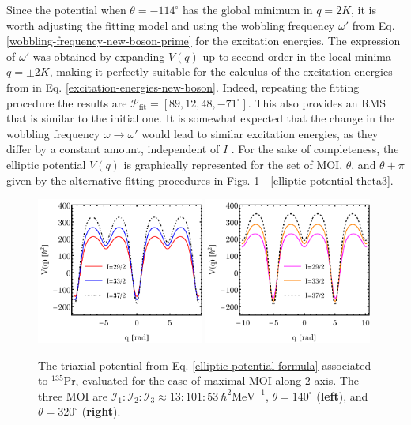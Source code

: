 Since the potential when $\theta=-114^\circ$ has the global minimum in $q=2K$, it is worth adjusting the fitting model and using the wobbling frequency $\omega'$ from Eq. \ref{wobbling-frequency-new-boson-prime} for the excitation energies. The expression of $\omega'$ was obtained by expanding $V(q)$ up to second order in the local minima $q=\pm 2K$, making it perfectly suitable for the calculus of the excitation energies from in Eq. \ref{excitation-energies-new-boson}. Indeed, repeating the fitting procedure the results are $\mathcal{P}_\text{fit}=\left[89,12,48,-71^\circ\right]$. This also provides an RMS that is similar to the initial one. It is somewhat expected that the change in the wobbling frequency $\omega\rightarrow\omega'$ would lead to similar excitation energies, as they differ by a constant amount, independent of $I$ \cite{raduta2020new}. For the sake of completeness, the elliptic potential $V(q)$ is graphically represented for the set of MOI, $\theta$, and $\theta+\pi$ given by the alternative fitting procedures in Figs. \ref{elliptic-potential-theta2} - \ref{elliptic-potential-theta3}.
\begin{figure}
    \centering
    \includegraphics[width=0.49\textwidth]{Chapters/Figures/potential-fit2-theta.pdf}
    \includegraphics[width=0.49\textwidth]{Chapters/Figures/potential-fit2-theta-pi.pdf}
    \caption{The triaxial potential from Eq. \ref{elliptic-potential-formula} associated to $^{135}$Pr, evaluated for the case of maximal MOI along $2$-axis. The three MOI are $\mathcal{I}_1:\mathcal{I}_2:\mathcal{I}_3\approx13:101:53\ \hbar^2\text{MeV}^{-1}$, $\theta=140^\circ$ (\textbf{left}), and $\theta=320^\circ$ (\textbf{right}).}
    \label{elliptic-potential-theta2}
\end{figure}
